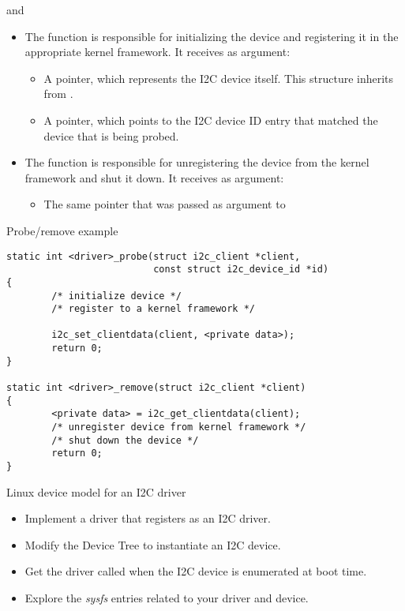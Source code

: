 \begin{frame}{ and }

  \begin{itemize}
  \item The  function is responsible for initializing
    the device and registering it in the appropriate kernel
    framework. It receives as argument:
    \begin{itemize}
    \item A  pointer, which represents the I2C
      device itself. This structure inherits from .
    \item A  pointer, which points to the
      I2C device ID entry that matched the device that is being
      probed.
    \end{itemize}
  \item The  function is responsible for
    unregistering the device from the kernel framework and shut it
    down. It receives as argument:
    \begin{itemize}
    \item The same  pointer that was passed as
      argument to 
    \end{itemize}
  \end{itemize}
\end{frame}

\begin{frame}[fragile]{Probe/remove example}
  \begin{block}{}
    \begin{verbatim}
static int <driver>_probe(struct i2c_client *client,
                          const struct i2c_device_id *id)
{
        /* initialize device */
        /* register to a kernel framework */

        i2c_set_clientdata(client, <private data>);
        return 0;
}

static int <driver>_remove(struct i2c_client *client)
{
        <private data> = i2c_get_clientdata(client);
        /* unregister device from kernel framework */
        /* shut down the device */
        return 0;
}
    \end{verbatim}
  \end{block}
\end{frame}

\setuplabframe
{Linux device model for an I2C driver}
{
  \begin{itemize}
  \item Implement a driver that registers as an I2C driver.
  \item Modify the Device Tree to instantiate an I2C device.
  \item Get the driver called when the I2C device is enumerated at
    boot time.
  \item Explore the {\em sysfs} entries related to your driver and
    device.
  \end{itemize}
}

